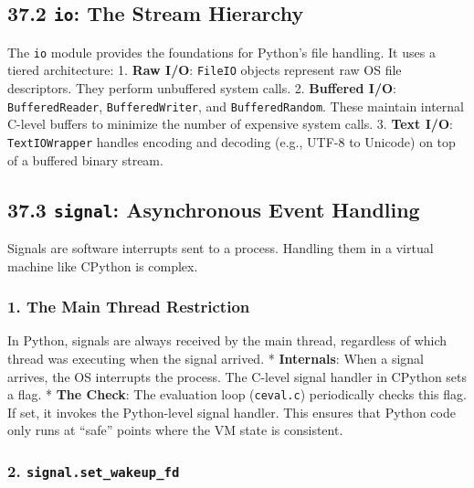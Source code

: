 \hypertarget{io-the-stream-hierarchy}{%
\subsection{\texorpdfstring{37.2 \texttt{io}: The Stream
Hierarchy}{37.2 io: The Stream Hierarchy}}\label{io-the-stream-hierarchy}}

The \passthrough{\lstinline!io!} module provides the foundations for
Python's file handling. It uses a tiered architecture: 1. \textbf{Raw
I/O}: \passthrough{\lstinline!FileIO!} objects represent raw OS file
descriptors. They perform unbuffered system calls. 2. \textbf{Buffered
I/O}: \passthrough{\lstinline!BufferedReader!},
\passthrough{\lstinline!BufferedWriter!}, and
\passthrough{\lstinline!BufferedRandom!}. These maintain internal
C-level buffers to minimize the number of expensive system calls. 3.
\textbf{Text I/O}: \passthrough{\lstinline!TextIOWrapper!} handles
encoding and decoding (e.g., UTF-8 to Unicode) on top of a buffered
binary stream.

\hypertarget{signal-asynchronous-event-handling}{%
\subsection{\texorpdfstring{37.3 \texttt{signal}: Asynchronous Event
Handling}{37.3 signal: Asynchronous Event Handling}}\label{signal-asynchronous-event-handling}}

Signals are software interrupts sent to a process. Handling them in a
virtual machine like CPython is complex.

\hypertarget{the-main-thread-restriction}{%
\subsubsection{1. The Main Thread
Restriction}\label{the-main-thread-restriction}}

In Python, signals are always received by the main thread, regardless of
which thread was executing when the signal arrived. *
\textbf{Internals}: When a signal arrives, the OS interrupts the
process. The C-level signal handler in CPython sets a flag. *
\textbf{The Check}: The evaluation loop
(\passthrough{\lstinline!ceval.c!}) periodically checks this flag. If
set, it invokes the Python-level signal handler. This ensures that
Python code only runs at ``safe'' points where the VM state is
consistent.

\hypertarget{signal.set_wakeup_fd}{%
\subsubsection{\texorpdfstring{2.
\texttt{signal.set\_wakeup\_fd}}{2. signal.set\_wakeup\_fd}}\label{signal.set_wakeup_fd}}

